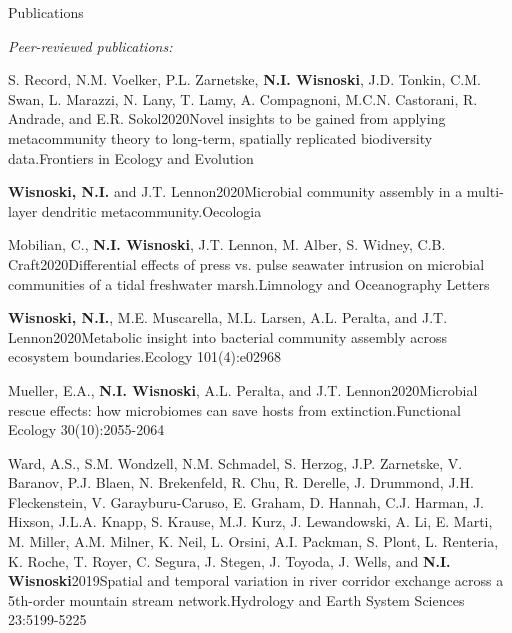 \documentclass{resume} %
\begin{document}
\begin{rhangSection}{Publications}
\bigskip


{\it Peer-reviewed publications: }

\begin{Publication}{S. Record, N.M. Voelker, P.L. Zarnetske, {\bf N.I. Wisnoski}, J.D. Tonkin, C.M. Swan, L. Marazzi, N. Lany, T. Lamy, A. Compagnoni, M.C.N. Castorani, R. Andrade, and E.R. Sokol}{2020}{Novel insights to be gained from applying metacommunity theory to long-term, spatially replicated biodiversity data.}{Frontiers in Ecology and Evolution}
\end{Publication}

\begin{Publication}{{\bf Wisnoski, N.I.} and J.T. Lennon}{2020}{Microbial community assembly in a multi-layer dendritic metacommunity.}{Oecologia}
\end{Publication}

\begin{Publication}{Mobilian, C., {\bf N.I. Wisnoski}, J.T. Lennon, M. Alber, S. Widney, C.B. Craft}{2020}{Differential effects of press vs. pulse seawater intrusion on microbial communities of a tidal freshwater marsh.}{Limnology and Oceanography Letters}
\end{Publication}

\begin{Publication}{{\bf Wisnoski, N.I.}, M.E. Muscarella, M.L. Larsen, A.L. Peralta, and J.T. Lennon}{2020}{Metabolic insight into bacterial community assembly across ecosystem boundaries.}{Ecology 101(4):e02968}
\end{Publication}

\begin{Publication}{Mueller, E.A., {\bf N.I. Wisnoski}, A.L. Peralta, and J.T. Lennon}{2020}{Microbial rescue effects: how microbiomes can save hosts from extinction.}{Functional Ecology 30(10):2055-2064}
\end{Publication}

\begin{Publication}{Ward, A.S., S.M. Wondzell, N.M. Schmadel, S. Herzog, J.P. Zarnetske, V. Baranov, P.J. Blaen, N. Brekenfeld, R. Chu, R. Derelle, J. Drummond, J.H. Fleckenstein, V. Garayburu-Caruso, E. Graham, D. Hannah, C.J. Harman, J. Hixson, J.L.A. Knapp, S. Krause, M.J. Kurz, J. Lewandowski, A. Li, E. Marti, M. Miller, A.M. Milner, K. Neil, L. Orsini, A.I. Packman, S. Plont, L. Renteria, K. Roche, T. Royer, C. Segura, J. Stegen, J. Toyoda, J. Wells, and {\bf N.I. Wisnoski}}{2019}{Spatial and temporal variation in river corridor exchange across a 5th-order mountain stream network.}{Hydrology and Earth System Sciences 23:5199-5225} 
\end{Publication}


\end{rhangSection}
\end{document}
